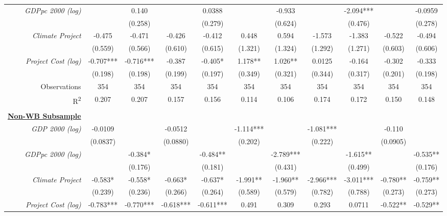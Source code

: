 \documentclass{article}
\begin{document}
\begin{singlespace}
\begin{landscape}
\begin{table}[H]
{\begin{tabular}{rcccccccccc}
					\textit{GDPpc 2000 (log)} &  & 0.140 &  & 0.0388 &  & -0.933 &  & -2.094*** &  & -0.0959 \\
					\textit{} &  & (0.258) &  & (0.279) &  & (0.624) &  & (0.476) &  & (0.278) \\
					\textit{Climate Project} & -0.475 & -0.471 & -0.426 & -0.412 & 0.448 & 0.594 & -1.573 & -1.383 & -0.522 & -0.494 \\
					\textit{} & (0.559) & (0.566) & (0.610) & (0.615) & (1.321) & (1.324) & (1.292) & (1.271) & (0.603) & (0.606) \\
					\textit{Project Cost (log)} & -0.707*** & -0.716*** & -0.387 & -0.405* & 1.178** & 1.026** & 0.0125 & -0.164 & -0.302 & -0.333 \\
					\textit{} & (0.198) & (0.198) & (0.199) & (0.197) & (0.349) & (0.321) & (0.344) & (0.317) & (0.201) & (0.198) \\ \hline
					Observations & 354 & 354 & 354 & 354 & 354 & 354 & 354 & 354 & 354 & 354 \\
					R\textsuperscript{2} & 0.207 & 0.207 & 0.157 & 0.156 & 0.114 & 0.106 & 0.174 & 0.172 & 0.150 & 0.148 \\ \hline
					\multicolumn{1}{l}{} & \multicolumn{1}{l}{} & \multicolumn{1}{l}{} & \multicolumn{1}{l}{} & \multicolumn{1}{l}{} & \multicolumn{1}{l}{} & \multicolumn{1}{l}{} & \multicolumn{1}{l}{} & \multicolumn{1}{l}{} & \multicolumn{1}{l}{} & \multicolumn{1}{l}{} \\
					{\ul \textbf{Non-WB Subsample}} &  &  &  &  &  &  &  &  &  &  \\
					\textit{GDP 2000 (log)} & -0.0109 &  & -0.0512 &  & -1.114*** &  & -1.081*** &  & -0.110 &  \\
					\textit{} & (0.0837) &  & (0.0880) &  & (0.202) &  & (0.222) &  & (0.0905) &  \\
					\textit{GDPpc 2000 (log)} &  & -0.384* &  & -0.484** &  & -2.789*** &  & -1.615** &  & -0.535** \\
					\textit{} &  & (0.176) &  & (0.181) &  & (0.431) &  & (0.499) &  & (0.176) \\
					\textit{Climate Project} & -0.583* & -0.558* & -0.663* & -0.637* & -1.991** & -1.960** & -2.966*** & -3.011*** & -0.780** & -0.759** \\
					\textit{} & (0.239) & (0.236) & (0.266) & (0.264) & (0.589) & (0.579) & (0.782) & (0.788) & (0.273) & (0.273) \\
					\textit{Project Cost (log)} & -0.783*** & -0.770*** & -0.618*** & -0.611*** & 0.491 & 0.309 & 0.293 & 0.0711 & -0.522** & -0.529** \\

\end{tabular}}
\end{table}
\end{landscape}
\end{singlespace}
\end{document}
